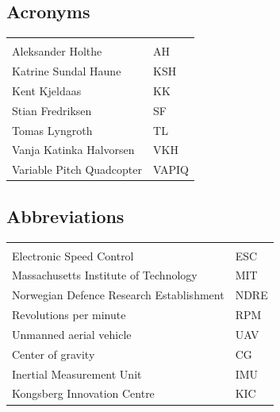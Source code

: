 \documentclass{article}
\begin{document}
\vspace*{2.0 cm}

\begin{center}
\section*{\textbf{Acronyms}}
\begin{tabular}{ll}
\rowcolor{cadetgrey}
    &   \\
Aleksander Holthe      & AH     
 \\\rowcolor{gainsboro}
Katrine Sundal Haune  & KSH \\
Kent Kjeldaas         & KK 
 \\\rowcolor{gainsboro}
Stian Fredriksen      & SF  \\
Tomas Lyngroth       & TL   
 \\\rowcolor{gainsboro}
Vanja Katinka Halvorsen     & VKH   \\
Variable Pitch Quadcopter   & VAPIQ
\end{tabular}                                                             
\end{center}

\vspace*{2.0 cm}

\begin{center}
\section*{\textbf{Abbreviations}}
\begin{tabular}{ll}
\rowcolor{cadetgrey}
    &   \\
Electronic Speed Control      & ESC          \\\rowcolor{gainsboro}
Massachusetts Institute of Technology       & MIT  \\
Norwegian Defence Research Establishment   & NDRE 
\\\rowcolor{gainsboro}
Revolutions per minute      & RPM   \\
Unmanned aerial vehicle     & UAV   \\  \rowcolor{gainsboro}
Center of gravity           & CG    \\
Inertial Measurement Unit   & IMU   \\ \rowcolor{gainsboro}
Kongsberg Innovation Centre & KIC   \\
\end{tabular}                                                             
\end{center}
\newpage
\end{document}
